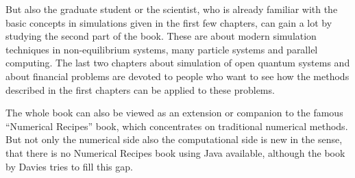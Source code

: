 \documentclass[a4paper]{book}
\begin{document}
But also the graduate student or the scientist, who is already familiar with the basic concepts in simulations given in the first few chapters, can gain a lot by studying the second part of the book.
These are about modern simulation techniques in non-equilibrium systems, many particle systems and parallel computing.
The last two chapters about simulation of open quantum systems and about financial problems are devoted to people who want to see how the methods described in the first chapters can be applied to these problems.

The whole book can also be viewed as an extension or companion to the famous ``Numerical Recipes'' book, which concentrates on traditional numerical methods.
But not only the numerical side also the computational side is new in the sense, that there is no Numerical Recipes book using Java available, although the book by Davies tries to fill this gap.
\end{document}
